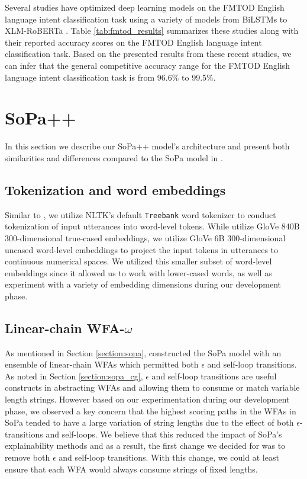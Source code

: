 Several studies have optimized deep learning models on the FMTOD English
language intent classification task using a variety of models from BiLSTMs to
XLM-RoBERTa
\citep{schuster-etal-2019-cross-lingual,zhang2019joint,zhang-etal-2020-intent}.
Table \ref{tab:fmtod_results} summarizes these studies along with their reported
accuracy scores on the FMTOD English language intent classification task. Based
on the presented results from these recent studies, we can infer that the
general competitive accuracy range for the FMTOD English language intent
classification task is from 96.6$\%$ to 99.5$\%$.

\section{SoPa++}

In this section we describe our SoPa++ model's architecture and present both
similarities and differences compared to the SoPa model in
\citet{schwartz2018sopa}.

\subsection{Tokenization and word embeddings}

Similar to \citet{schwartz2018sopa}, we utilize NLTK's default \texttt{Treebank}
word tokenizer \citep{bird-loper-2004-nltk} to conduct tokenization of input
utterances into word-level tokens. While \citet{schwartz2018sopa} utilize GloVe
840B 300-dimensional true-cased embeddings, we utilize GloVe 6B 300-dimensional
uncased word-level embeddings \citep{pennington2014glove} to project the input
tokens in utterances to continuous numerical spaces. We utilized this smaller
subset of word-level embeddings since it allowed us to work with lower-cased
words, as well as experiment with a variety of embedding dimensions during our
development phase.

\subsection{Linear-chain WFA-$\omega$}

As mentioned in Section \ref{section:sopa}, \citet{schwartz2018sopa}
constructed the SoPa model with an ensemble of linear-chain WFAs which permitted
both $\epsilon$ and self-loop transitions. As noted in Section
\ref{section:sopa_cg}, $\epsilon$ and self-loop transitions are useful
constructs in abstracting WFAs and allowing them to consume or match variable length
strings. However based on our experimentation during our development phase, we
observed a key concern that the highest scoring paths in the WFAs in SoPa tended
to have a large variation of string lengths due to the effect of both
$\epsilon$-transitions and self-loops. We believe that this reduced the impact of
SoPa's explainability methods and as a result, the first change we decided for
was to remove both $\epsilon$ and self-loop transitions. With this change, we could
at least ensure that each WFA would always consume strings of fixed lengths.

